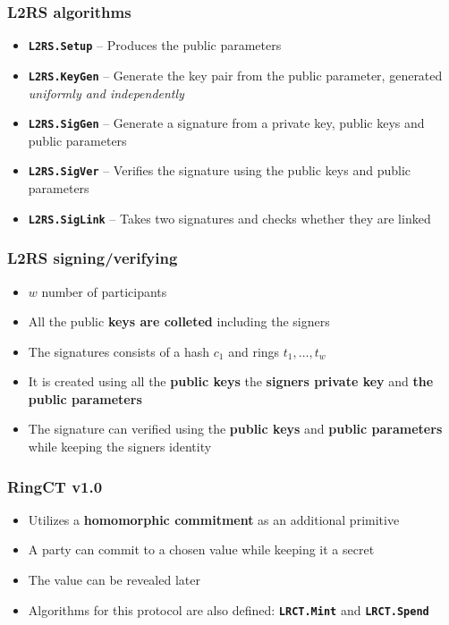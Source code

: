 \documentclass[%
  14pt,       				%
	c,                  %
	aspectratio=1610,   %
	unicode,						%
]{beamer}				    	%
\begin{document}
\begin{frame}
  \frametitle{L2RS algorithms}
  \large{
    \begin{itemize}
      \item \textbf{\texttt{L2RS.Setup}} -- Produces the public parameters
      \item \textbf{\texttt{L2RS.KeyGen}} -- Generate the key pair from the public parameter, generated \textit{uniformly and independently}
      \item \textbf{\texttt{L2RS.SigGen}} -- Generate a signature from a private key, public keys and public parameters
      \item \textbf{\texttt{L2RS.SigVer}} -- Verifies the signature using the public keys and public parameters
      \item \textbf{\texttt{L2RS.SigLink}} -- Takes two signatures and checks whether they are linked
    \end{itemize}
  }
\end{frame}

\begin{frame}
  \frametitle{L2RS signing/verifying}
  \large{
    \begin{itemize}
      \item $w$ number of participants
      \item All the public \textbf{keys are colleted} including the signers
      \item The signatures consists of a hash $c_1$ and rings $t_1,\dots,t_w$
      \item It is created using all the \textbf{public keys} the \textbf{signers private key} and \textbf{the public parameters}
      \item The signature can verified using the \textbf{public keys} and \textbf{public parameters} while keeping the signers identity
    \end{itemize}
  }
\end{frame}

\begin{frame}
  \frametitle{RingCT v1.0}
  \large{
    \begin{itemize}
      \item Utilizes a \textbf{homomorphic commitment} as an additional primitive
      \item A party can commit to a chosen value while keeping it a secret
      \item The value can be revealed later
      \item Algorithms for this protocol are also defined: \textbf{\texttt{LRCT.Mint}} and \textbf{\texttt{LRCT.Spend}}
    \end{itemize}
  }
\end{frame}
\end{document}
